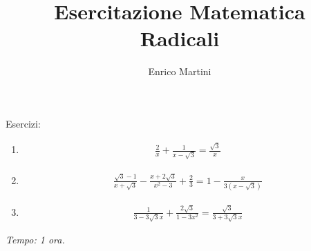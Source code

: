 \documentclass[a4paper]{article}
\title{Esercitazione Matematica\\ Radicali}
\author{Enrico Martini}
\begin{document}
\maketitle
\thispagestyle{empty}

Esercizi:

\begin{enumerate}
    \item \begin{align*}
        \frac{2}{x}+\frac{1}{x-\sqrt{3}}=\frac{\sqrt{3}}{x}
    \end{align*}
    \item \begin{align*}
        \frac{\sqrt{3}-1}{x+\sqrt{3}}-\frac{x+2\sqrt{3}}{x^2-3}+\frac{2}{3}=1-\frac{x}{3(x-\sqrt{3})}
    \end{align*}
    \item \begin{align*}
        \frac{1}{3-3\sqrt{3}x}+\frac{2\sqrt{3}}{1-3x^2}=\frac{\sqrt{3}}{3+3\sqrt{3}x}
    \end{align*}
\end{enumerate}
\textit{Tempo: 1 ora.}
\end{document}
